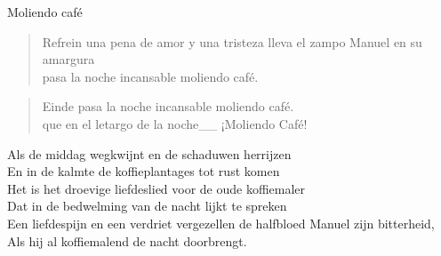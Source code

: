 \begin{song}[tropical]{Moliendo café}
\begin{verse}{Refrein}
una pena de amor y una tristeza lleva el zampo Manuel en su amargura\\
pasa la noche incansable moliendo café.\hspace{1em}\chord{$\downarrow\downarrow$}\hspace{1.5em}\chord{$\downarrow\downarrow$}
\end{verse}

\begin{verse}{Einde}
pasa la noche incansable moliendo café.\hspace{1em}\chord{$\downarrow\downarrow$}\hspace{1.5em}\chord{$\downarrow\downarrow$}\\
que en el letargo de la noche\_\_ ¡Moliendo Café!
\end{verse}
\end{song}

\begin{translation}Als de middag wegkwijnt en de schaduwen herrijzen\\
En in de kalmte de koffieplantages tot rust komen\\
Het is het droevige liefdeslied voor de oude koffiemaler\\
Dat in de bedwelming van de nacht lijkt te spreken\\
\vspace{1em}
Een liefdespijn en een verdriet vergezellen de halfbloed Manuel zijn bitterheid,\\
Als hij al koffiemalend de nacht doorbrengt.\\
\end{translation}
